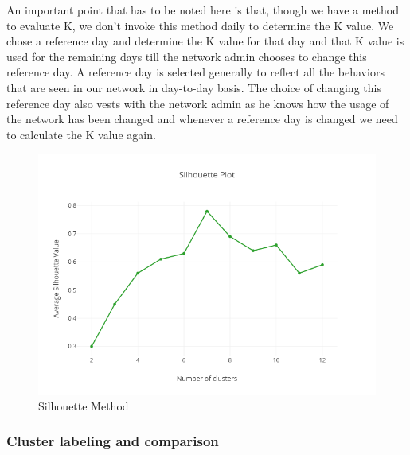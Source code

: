    An important point that has to be noted here is that, though we have a method to evaluate K, we don't invoke this method daily to determine the K value. We chose a reference day and determine the K value for that day and that K value is used for the remaining days till the network admin chooses to change this reference day. A reference day is selected generally to reflect all the behaviors that are seen in our network in day-to-day basis. The choice of changing this reference day also vests with the network admin as he knows how the usage of the network has been changed and whenever a reference day is changed we need to calculate the K value again.
   
 \begin{figure}[t]
 	\centerline{\includegraphics[scale = 0.6]{silhouette.png}}
 	\caption{Silhouette Method}%
 \end{figure}
 
\subsubsection{Cluster labeling and comparison}  \label{cluster_labeling}

